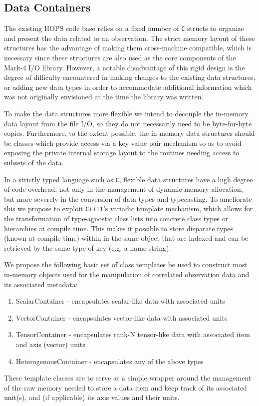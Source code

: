 \documentclass[hidelinks]{article}
\let\Oldsubsection\subsection
\renewcommand{\subsection}{\FloatBarrier\Oldsubsection}
\begin{document}
\subsection{Data Containers}

The existing HOPS code base relies on a fixed number of \texttt{C} structs to organize and present the data related to an observation. The strict memory layout of these structures has the advantage of making them cross-machine compatible, which is necessary since these structures are also used as the core components of the Mark-4 I/O library. However, a notable disadvantage of this rigid design is the degree of difficulty encountered in making changes to the existing data structures, or adding new data types in order to accommodate additional information which was not originally envisioned at the time the library was written.

To make the data structures more flexible we intend to decouple the in-memory data layout from the file I/O, so they do not necessarily need to be byte-for-byte copies.
Furthermore, to the extent possible, the in-memory data structures should be classes which provide access via a key-value pair mechanism so as to avoid exposing the private internal storage layout to the routines needing access to subsets of the data.

In a strictly typed language such as \texttt{C}, flexible data structures have a high degree of code overhead, not only in the management of dynamic memory allocation, but more severely in the conversion of data types and typecasting. To ameliorate this we propose to exploit \texttt{C++11}'s variadic template mechanism, which allows for the transformation of type-agnostic class lists into concrete class types or hierarchies at compile time. This makes it possible to store disparate types (known at compile time) within in the same object that are indexed and can be retrieved by the same type of key (e.g. a name string). 

We propose the following basic set of class templates be used to construct most in-memory objects used for the manipulation of correlated observation data and its associated metadata:
\begin{enumerate}
 \item ScalarContainer - encapsulates scalar-like data with associated units
 \item VectorContainer - encapsulates vector-like data with associated units
 \item TensorContainer - encapsulates rank-N tensor-like data with associated item and axis (vector) units
 \item HeterogenousContainer - encapsulates any of the above types
\end{enumerate}
These template classes are to serve as a simple wrapper around the management of the raw memory needed to store a data item and keep track of its associated unit(s), and (if applicable) its axis values and their units.
\end{document}
